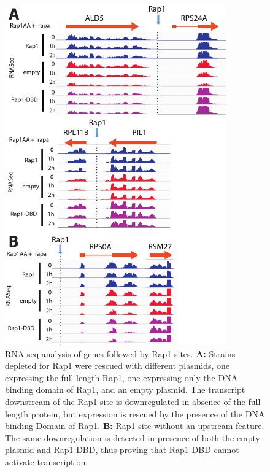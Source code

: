 \begin{figure}[hp!]

\centering
\includegraphics[width=0.85\textwidth]{figures/results/rap/eight.pdf}
\caption[RNA-seq analysis of genes followed by Rap1 sites.]{RNA-seq analysis of genes followed by Rap1 sites. \textbf{A: }Strains depleted for Rap1 were rescued with different plasmids, one expressing the full length Rap1, one expressing only the DNA-binding domain of Rap1, and an empty plasmid. The transcript downstream of the Rap1 site is downregulated in absence of the full length protein, but expression is rescued by the presence of the DNA binding Domain of Rap1. \textbf{B: }Rap1 site without an upstream feature. The same downregulation is detected in presence of both the empty plasmid and Rap1-DBD, thus proving that Rap1-DBD cannot activate transcription.}
\label{fig:eight}

\end{figure}

